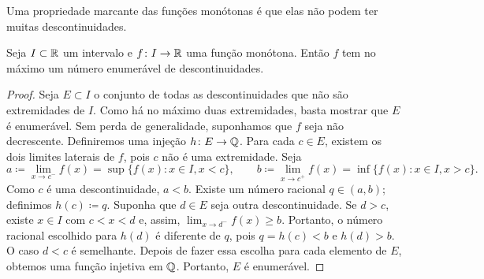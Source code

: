 Uma propriedade marcante das funções monótonas é que elas não podem ter
muitas descontinuidades.

\begin{cor} \label{cor:monotcountcont}
Seja $I \subset {\mathbb{R}}$ um intervalo e
$f \colon I \to {\mathbb{R}}$ uma função monótona. Então $f$ tem no máximo
um número enumerável de descontinuidades.
\end{cor}

\begin{proof}
Seja $E \subset I$ o conjunto de todas as descontinuidades
que não são extremidades de $I$. Como há
no máximo duas extremidades, basta mostrar que $E$ é enumerável.
Sem perda de generalidade, suponhamos que $f$ seja não decrescente.
Definiremos uma injeção $h \colon E \to {\mathbb{Q}}$.
Para cada $c \in E$,
existem os dois limites laterais de $f$, pois $c$ não é uma extremidade.
Seja
\begin{equation*}
a
\coloneqq \lim_{x \to c^-} f(x) = \sup \bigl\{ f(x) : x \in I, x < c \bigr\} ,
\qquad
b
\coloneqq \lim_{x \to c^+} f(x) = \inf \bigl\{ f(x) : x \in I, x > c \bigr\} .
\end{equation*}
Como $c$ é uma descontinuidade, $a < b$.
Existe um número racional $q \in (a,b)$; definimos $h(c) \coloneqq q$.
Suponha que $d \in E$ seja outra descontinuidade.
Se $d > c$, existe
$x \in I$ com $c < x < d$ e, assim, $\lim_{x \to d^-} f(x) \geq b$.
Portanto, o número racional escolhido para $h(d)$ é diferente de $q$,
pois $q=h(c) < b$ e $h(d) > b$.
O caso $d < c$ é semelhante. Depois de fazer essa escolha para
cada elemento de $E$, obtemos uma função injetiva em ${\mathbb{Q}}$. Portanto, $E$ é enumerável.
\end{proof}

